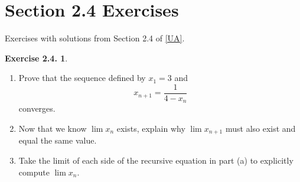 \documentclass[12pt]{article}
\theoremstyle{definition}
\theoremstyle{exercise}
\newtheorem{exercise}{Exercise 2.4.}
\theoremstyle{solution}
\begin{document}
\section{Section 2.4 Exercises}

Exercises with solutions from Section 2.4 of \hyperlink{ua}{[UA]}.

\begin{exercise}
\label{ex:1}
    \begin{enumerate}
        \item Prove that the sequence defined by \( x_1 = 3 \) and
        \[
            x_{n+1} = \frac{1}{4 - x_n}
        \]
        converges.

        \item Now that we know \( \lim x_n \) exists, explain why \( \lim x_{n+1} \) must also exist and equal the same value.

        \item Take the limit of each side of the recursive equation in part (a) to explicitly compute \( \lim x_n \).
    \end{enumerate}
\end{exercise}
\end{document}
